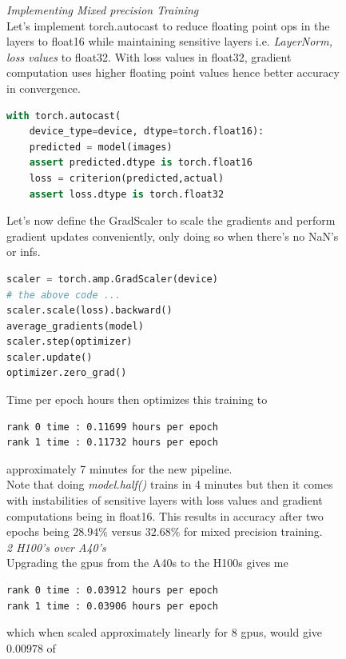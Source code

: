 \documentclass[12pt]{article}
\newcommand{\customtext}[3]{%
    \vspace{#2} %
    \fontsize{13}{8}\textcolor{#1}{\textit{#3}}%
}
\begin{document}
\begin{figure}[!htb]
    \begin{minipage}[t]{0.65\textwidth}
    \customtext{xtitle}{0em}{Implementing Mixed precision Training}\\
    Let's implement {torch.autocast} to reduce floating point ops in the layers 
    to float16 while maintaining sensitive layers i.e. {\it LayerNorm, loss values} 
    to float32. With loss values in float32, gradient computation uses higher floating 
    point values hence better accuracy in convergence.
\begin{lstlisting}[language=python,style=python,basicstyle=\ttfamily\footnotesize]
with torch.autocast(
    device_type=device, dtype=torch.float16):
    predicted = model(images)
    assert predicted.dtype is torch.float16
    loss = criterion(predicted,actual)
    assert loss.dtype is torch.float32
\end{lstlisting}
Let's now define the GradScaler to scale the gradients and perform gradient updates 
conveniently, only doing so when there's no NaN's or infs.
\begin{lstlisting}[language=python,style=python,basicstyle=\ttfamily\footnotesize]
scaler = torch.amp.GradScaler(device)
# the above code ... 
scaler.scale(loss).backward()
average_gradients(model)
scaler.step(optimizer)
scaler.update()
optimizer.zero_grad()
\end{lstlisting}
Time per epoch hours then optimizes this training to 
\begin{lstlisting}[language=bash,style=bash,basicstyle=\ttfamily\footnotesize]
rank 0 time : 0.11699 hours per epoch
rank 1 time : 0.11732 hours per epoch
\end{lstlisting}
approximately 7 minutes for the new pipeline.\\
Note that doing {\it model.half()} trains in 4 minutes but then it comes with instabilities 
of sensitive layers with loss values and gradient computations being in float16. This results 
in accuracy after two epochs being $28.94 \%$ versus $32.68\%$ for mixed precision 
training.\\
\customtext{xtitle}{0em}{2 H100's over A40's}\\
Upgrading the gpus from the A40s to the H100s gives me 
\begin{lstlisting}[language=bash,style=bash,basicstyle=\ttfamily\footnotesize]
rank 0 time : 0.03912 hours per epoch
rank 1 time : 0.03906 hours per epoch
\end{lstlisting}
which when scaled approximately linearly for 8 gpus, would give $0.00978$ of 

\end{minipage}
\end{figure}
\end{document}
